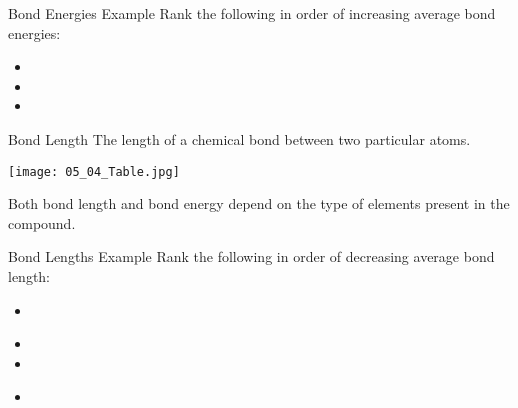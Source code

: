 \documentclass[notes=hide]{beamer}
\begin{document}
\begin{frame}[t]{Bond Energies Example}
	Rank the following in order of \alert{increasing} average bond energies:

	\begin{itemize}
		\item {} 
		\item {} 
		\item {} 
	\end{itemize}
\end{frame}

\begin{frame}{Bond Length}
	The length of a chemical bond between two particular atoms.
	\begin{center}
		\texttt{[image: 05\_04\_Table.jpg]}
	\end{center}
			Both bond length and bond energy depend on the type of
			elements present in the compound.
\end{frame}

\begin{frame}[t]{Bond Lengths Example}
	Rank the following in order of \alert{decreasing} average bond length:

	\begin{itemize}
		\item {}~  
		\item {}  
		\item {}  
		\item {}~  
	\end{itemize}
\end{frame}

%
\end{document}

